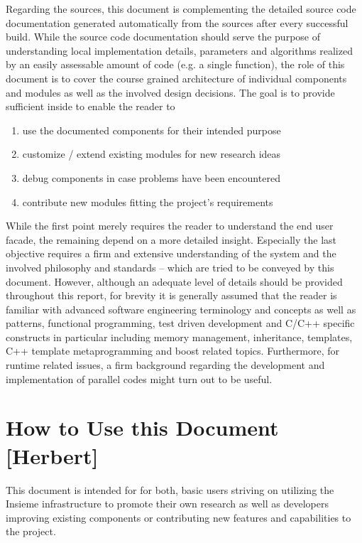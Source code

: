 Regarding the sources, this document is complementing the detailed source code
documentation \cite{insieme_source_doc} generated automatically from the sources
after every successful build. While the source code documentation should serve
the purpose of understanding local implementation details, parameters and
algorithms realized by an easily assessable amount of code (e.g. a single
function), the role of this document is to cover the course grained architecture
of individual components and modules as well as the involved design decisions.
The goal is to provide sufficient inside to enable the reader to

\begin{enumerate}
  \item use the documented components for their intended purpose
  \item customize / extend existing modules for new research ideas
  \item debug components in case problems have been encountered
  \item contribute new modules fitting the project's requirements
\end{enumerate}

While the first point merely requires the reader to understand the end user
facade, the remaining depend on a more detailed insight. Especially the last
objective requires a firm and extensive understanding of the system and the
involved philosophy and standards -- which are tried to be conveyed by this
document. However, although an adequate level of details should be provided
throughout this report, for brevity it is generally assumed that the reader is
familiar with advanced software engineering terminology and concepts as well as
patterns, functional programming, test driven development and C/C++ specific
constructs in particular including memory management, inheritance, templates,
C++ template metaprogramming and boost related topics. Furthermore, for runtime
related issues, a firm background regarding the development and
implementation of parallel codes might turn out to be useful.

\section{How to Use this Document  [Herbert]}
This document is intended for for both, basic users striving on utilizing the
Insieme infrastructure to promote their own research as well as developers
improving existing components or contributing new features and capabilities to
the project.

